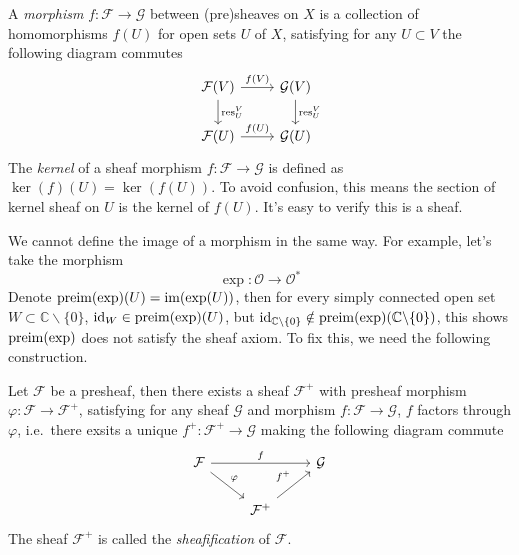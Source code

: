 \begin{defn}
    A \emph{morphism} $f:\mathcal{F}\to\mathcal{G}$ between (pre)sheaves on $X$ is a collection of homomorphisms $f(U)$ for open sets $U$ of $X$, satisfying for any $U\subset V$ the following diagram commutes
    \[\begin{tikzcd}
        \mathcal{F}(V)\ar[r,"f(V)"]\ar[d,"\res^V_U"] & \mathcal{G}(V)\ar[d,"\res^V_U"]\\
        \mathcal{F}(U)\ar[r,"f(U)"] & \mathcal{G}(U)
    \end{tikzcd}\]
    The \emph{kernel} of a sheaf morphism $f:\mathcal{F}\to\mathcal{G}$ is defined as $\ker(f)(U)=\ker(f(U))$.
    To avoid confusion, this means the section of kernel sheaf on $U$ is the kernel of $f(U)$.
    It's easy to verify this is a sheaf.
\end{defn}

\begin{eg}
    We cannot define the image of a morphism in the same way.
    For example, let's take the morphism
    \[\exp:\mathcal{O}\to\mathcal{O}^*\]
    Denote $\operatorname{preim}(\exp)(U)=\operatorname{im}(\exp(U))$, then for every simply connected open set $W\subset\mathbb{C}\backslash\{0\}$, $\mathrm{id}_W\in\operatorname{preim}(\exp)(U)$, but $\mathrm{id}_{\mathbb{C}\backslash\{0\}}\notin\operatorname{preim}(\exp)(\mathbb{C}\backslash\{0\})$, this shows $\operatorname{preim}(\exp)$ does not satisfy the sheaf axiom.
    To fix this, we need the following construction.
\end{eg}

\begin{defn}
    Let $\mathcal{F}$ be a presheaf, then there exists a sheaf $\mathcal{F}^+$ with presheaf morphism $\varphi:\mathcal{F}\to\mathcal{F}^+$, satisfying for any sheaf $\mathcal{G}$ and morphism $f:\mathcal{F}\to\mathcal{G}$, $f$ factors through $\varphi$, i.e.\ there exsits a unique $f^+:\mathcal{F}^+\to\mathcal{G}$ making the following diagram commute
    \[\begin{tikzcd}
        \mathcal{F} \ar[rr, "f"] \ar[dr, "\varphi"] & & \mathcal{G} \\
        {} & \mathcal{F}^+\ar[ur, "f^+"] & {}
    \end{tikzcd}\]
    The sheaf $\mathcal{F}^+$ is called the \emph{sheafification} of $\mathcal{F}$.
\end{defn}

